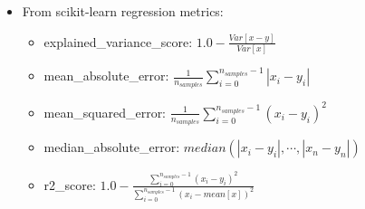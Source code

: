 \begin{itemize}
  \item   From scikit-learn regression metrics:
    \begin{itemize}
      \item explained\_variance\_score: $1.0 - \frac{Var[x-y]}{Var[x]}$
      \item mean\_absolute\_error: $\frac{1}{n_{samples}}\sum_{i=0}^{n_{samples}-1}|x_i-y_i|$
      \item mean\_squared\_error: $\frac{1}{n_{samples}}\sum_{i=0}^{n_{samples}-1}(x_i-y_i)^2$
      \item median\_absolute\_error: $median(|x_i-y_i|, \cdots, |x_n-y_n|)$
      \item r2\_score: $1.0-\frac{\sum_{i=0}^{n_{samples}-1}(x_i-y_i)^2}{\sum_{i=0}^{n_{samples}-1}(x_i-mean[x])^2}$
    \end{itemize}
     

\end{itemize}
